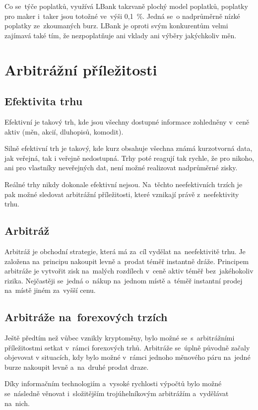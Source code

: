 \documentclass[thesis=B,czech]{FITthesis}[2019/03/21]
\begin{document}
Co se~týče poplatků, využívá LBank takzvaně plochý model poplatků, poplatky pro maker i~taker jsou totožné ve~výši 0,1~\%. Jedná se~o nadprůměrně nízké poplatky ze~zkoumaných burz. LBank je oproti svým konkurentům velmi zajímavá také tím, že nezpoplatňuje ani vklady ani výběry jakýchkoliv měn. \cite{cryptowisser_lbank}


\section{Arbitrážní příležitosti}
\subsection{Efektivita trhu}
Efektivní je takový trh, kde jsou všechny dostupné informace zohledněny v~ceně aktiv (měn, akcií, dluhopisů, komodit). \cite{efektivita_trhu}

Silně efektivní trh je takový, kde kurz obsahuje všechna známá kurzotvorná data, jak veřejná, tak i veřejně nedostupná. Trhy poté reagují tak rychle, že pro nikoho, ani pro vlastníky neveřejných dat, není možné realizovat nadprůměrné zisky. \cite{efektivnost_trhu}

Reálné trhy nikdy dokonale efektivní nejsou. Na~těchto neefektivních trzích je pak možné sledovat arbitrážní příležitosti, které vznikají právě z~neefektivity trhu. \cite{pecev, what_is_arbitage} 

\subsection{Arbitráž}
Arbitráž je obchodní strategie, která má za~cíl vydělat na~neefektivitě trhu. Je založena na~principu nakoupit levně a~prodat téměř instantně dráže. Principem arbitráže je vytvořit zisk na~malých rozdílech v~ceně aktiv téměř bez~jakéhokoliv rizika. Nejčastěji se~jedná o~nákup na~jednom místě a~téměř instantní prodej na~místě jiném za~vyšší cenu. \cite{Capital}

\subsection{Arbitráže na~forexových trzích}
Ještě předtím než vůbec vznikly kryptoměny, bylo možné se~s~arbitrážními příležitostmi setkat v~rámci forexových trhů. Arbitráže se~úplně původně začaly objevovat v situacích, kdy bylo možné v~rámci jednoho měnového páru na~jedné burze nakoupit levně a~na~druhé prodat draze. 

Díky informačním technologiím a~vysoké rychlosti výpočtů bylo možné se~následně věnovat i~složitějším trojúhelníkovým arbitrážím a~vydělávat \linebreak na~nich. \cite{investopedia_forex_arbitrage}
\end{document}
